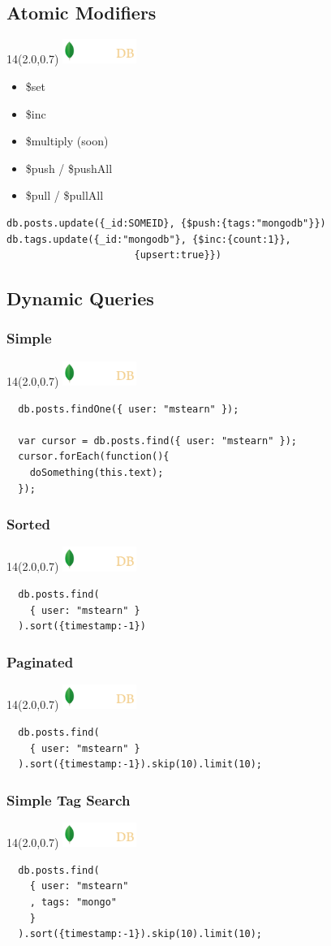 \documentclass{beamer}
\newcommand{\MongoLogo}{
\begin{textblock}{14}(2.0,0.7)
  \includegraphics[height=0.8cm]{logo-mongodb-ondark.png}
\end{textblock}
}
\begin{document}
  
\subsection{Atomic Modifiers}
\begin{frame}[fragile]
  \MongoLogo
  \begin{itemize}
    \item \$set
    \item \$inc
    \item \$multiply (soon)
    \item \$push / \$pushAll
    \item \$pull / \$pullAll
  \end{itemize}


    \begin{small}
    \begin{verbatim}
db.posts.update({_id:SOMEID}, {$push:{tags:"mongodb"}})
db.tags.update({_id:"mongodb"}, {$inc:{count:1}},
                      {upsert:true}})
    \end{verbatim}
    \end{small}
\end{frame}

\subsection{Dynamic Queries}

\begin{frame}[fragile]
  \frametitle{Simple}
  \MongoLogo

  \begin{verbatim}
  db.posts.findOne({ user: "mstearn" });

  var cursor = db.posts.find({ user: "mstearn" });
  cursor.forEach(function(){
    doSomething(this.text);
  });
  \end{verbatim}
  
\end{frame}

\begin{frame}[fragile]
  \frametitle{Sorted}
  \MongoLogo

  \begin{verbatim}
  db.posts.find(
    { user: "mstearn" }
  ).sort({timestamp:-1})
  \end{verbatim}
  
\end{frame}
\begin{frame}[fragile]
  \frametitle{Paginated}
  \MongoLogo

  \begin{verbatim}
  db.posts.find(
    { user: "mstearn" }
  ).sort({timestamp:-1}).skip(10).limit(10);
  \end{verbatim}
  
\end{frame}
\begin{frame}[fragile]
  \frametitle{Simple Tag Search}
  \MongoLogo

  \begin{verbatim}
  db.posts.find(
    { user: "mstearn"
    , tags: "mongo"
    }
  ).sort({timestamp:-1}).skip(10).limit(10);
  \end{verbatim}
  
\end{frame}
\end{document}
